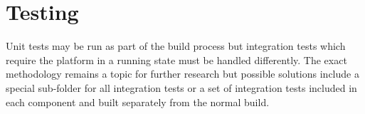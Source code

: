 \section{Testing}
\label{sec:testing}

Unit tests may be run as part of the build process but integration tests which require the
\learnpad platform in a running state must be handled differently. The exact methodology
remains a topic for further research but possible solutions include a special sub-folder
for all integration tests or a set of integration tests included in each component and built
separately from the normal build.
